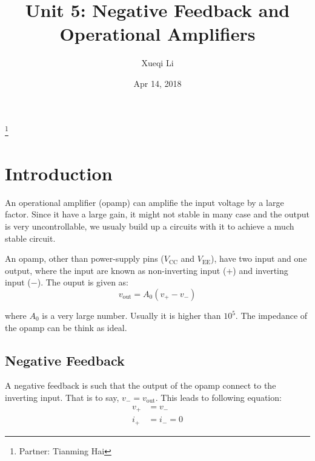 \documentclass[aps,prl,reprint]{revtex4-1}
\newcommand{\vcc}{V_\text{CC}}
\begin{document}
\title{Unit 5: Negative Feedback and Operational Amplifiers}
\author{Xueqi Li}
\thanks{Partner: Tianming Hai}
\noaffiliation
\date{Apr 14, 2018}



\maketitle

\section{Introduction}  
    An operational amplifier (opamp) can amplifie the input voltage by a large factor. Since it have a large gain, it might not stable in many case and the output is very uncontrollable, we usualy build up a circuits with it to achieve a much stable circuit.

    An opamp, other than power-supply pins ($\vcc$ and $V_\text{EE}$), have two input and one output, where the input are known as non-inverting input (+) and inverting input ($-$). The ouput is given as:
    \begin{equation}
        v_\text{out} = A_0 (v_+ - v_-) \label{eq:opamp}
    \end{equation}

where $A_0$ is a very large number. Usually it is higher than $10^5$. The impedance of the opamp can be think as ideal.
    \subsection{Negative Feedback}
        A negative feedback is such that the output of the opamp connect to the inverting input. That is to say, $v_- = v_\text{out}$. This leads to following equation:
        \begin{subequations}
            \begin{align}
                v_+ &= v_- \label{eq:veq}  \\
                i_+ &= i_- = 0 \label{eq:ieq}
            \end{align}
        \end{subequations}
\end{document}
